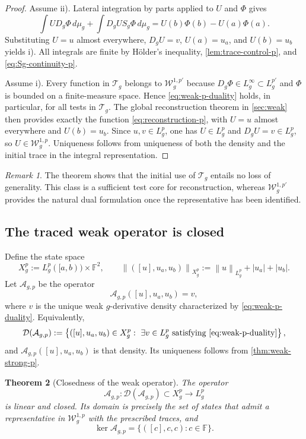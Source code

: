 \documentclass[preprint,12pt]{elsarticle}
\newenvironment{revision}{\begingroup\color{red}}{\endgroup}
\newenvironment{revision}{}{}
\newtheorem{theorem}{Theorem}[section]
\theoremstyle{definition}
\theoremstyle{remark}
\newtheorem{remark}[theorem]{Remark}
\newcommand{\F}{\mathbb F}
\newcommand{\norm}[1]{\left\lVert#1\right\rVert}
\newcommand{\abs}[1]{\left\lvert#1\right\rvert}
\begin{document}
\begin{proof}
Assume ii). Lateral integration by parts applied to $U$ and $\Phi$ gives
\[
 \int U D_g\Phi\,d\mu_g+\int D_gU S_g\Phi\,d\mu_g
 =U(b)\Phi(b)-U(a)\Phi(a).
\]
Substituting $U=u$ almost everywhere, $D_gU=v$, $U(a)=u_a$, and $U(b)=u_b$ yields i). All integrals are finite by H\"older's inequality, \cref{lem:trace-control-p}, and \eqref{eq:Sg-continuity-p}.

Assume i). Every function in $\mathcal T_g$ belongs to $\mathcal W_g^{1,p'}$ because $D_g\Phi\in L_g^\infty\subset L_g^{p'}$ and $\Phi$ is bounded on a finite-measure space. Hence \eqref{eq:weak-p-duality} holds, in particular, for all tests in $\mathcal T_g$. The global reconstruction theorem in \cref{sec:weak} then provides exactly the function \eqref{eq:reconstruction-p}, with $U=u$ almost everywhere and $U(b)=u_b$. Since $u,v\in L_g^p$, one has $U\in L_g^p$ and $D_gU=v\in L_g^p$, so $U\in\mathcal W_g^{1,p}$. Uniqueness follows from uniqueness of both the density and the initial trace in the integral representation.
\end{proof}

\begin{remark}
The theorem shows that the initial use of $\mathcal T_g$ entails no loss of generality. This class is a sufficient test core for reconstruction, whereas $\mathcal W_g^{1,p'}$ provides the natural dual formulation once the representative has been identified.
\end{remark}

\subsection{The traced weak operator is closed}

Define the state space
\[
 X_g^p:=L_g^p([a,b))\times\F^2,
 \qquad
 \norm{([u],u_a,u_b)}_{X_g^p}
 :=\norm{u}_{L_g^p}+\abs{u_a}+\abs{u_b}.
\]
Let $\mathcal A_{g,p}$ be the operator
\[
 \mathcal A_{g,p}([u],u_a,u_b)=v,
\]
\begin{revision}
where \(v\) is the unique weak \(g\)-derivative density characterized by
\eqref{eq:weak-p-duality}.  Equivalently,
\[
 \mathcal D(\mathcal A_{g,p})
 :=\left\{([u],u_a,u_b)\in X_g^p:\ \exists v\in L_g^p
 \text{ satisfying \eqref{eq:weak-p-duality}}\right\},
\]
and \(\mathcal A_{g,p}([u],u_a,u_b)\) is that density.  Its uniqueness follows
from \cref{thm:weak-strong-p}.
\end{revision}

\begin{theorem}[Closedness of the weak operator]\label{thm:closed-operator}
The operator
\[
 \mathcal A_{g,p}:\mathcal D(\mathcal A_{g,p})\subset X_g^p\longrightarrow L_g^p
\]
is linear and closed. Its domain is precisely the set of states that admit a representative in $\mathcal W_g^{1,p}$ with the prescribed traces, and
\[
 \ker\mathcal A_{g,p}
 =\{([c],c,c):c\in\F\}.
\]
\end{theorem}
\end{document}
